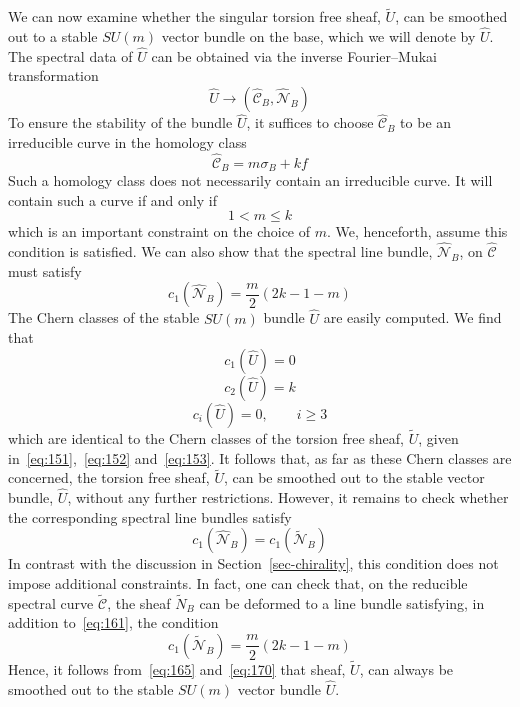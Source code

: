 \documentclass[a4paper,12pt]{article}
\numberwithin{equation}{section}
\def\cC{{\mathcal C}}
\def\cN{{\mathcal N}}
\theoremstyle{plain}
\begin{document}
We can now examine whether the singular torsion free sheaf,  
$\widetilde{U}$, can
be smoothed out to a stable $SU(m)$ vector bundle on the base, which we
will denote by $\widehat{U}$. The spectral data of $\widehat{U}$ 
can be obtained via
the inverse Fourier--Mukai transformation
\begin{equation}
\widehat{U} \longrightarrow (\widehat{\cC}_{B}, \widehat{\cN}_{B})
\label{eq:162}
\end{equation}
To ensure the stability of 
the bundle $\widehat{U}$, it suffices to choose $\widehat{\cC}_{B}$ 
to be an
irreducible curve in the homology class
\begin{equation}
\widehat{\cC}_{B}= m\sigma_{B}+ kf
\label{eq:163}
\end{equation}
Such a homology class does not necessarily contain an 
irreducible curve. It will contain such a curve if
and only if
\begin{equation}
1 < m \leq k
\label{eq:164}
\end{equation}
which is an important constraint on the choice of $m$. We, henceforth, assume
this condition is satisfied.
We can also show that the spectral line bundle, 
$\widehat{\cN}_{B}$, on $\widehat{\cC}$ must satisfy
\begin{equation}
c_{1}(\widehat{\cN}_{B})= \frac{m}{2}(2k -1 -m)
\label{eq:165}
\end{equation}
The Chern classes of the stable $SU(m)$ bundle $\widehat{U}$
are easily computed. We find that
\begin{equation}
c_{1}(\widehat{U})=0
\label{eq:166}
\end{equation}
\begin{equation}
c_{2}(\widehat{U})=k
\label{eq:167}
\end{equation}
\begin{equation}
c_{i}(\widehat{U})=0, \qquad i\geq3
\label{eq:168}
\end{equation}
which are identical to the Chern classes of the torsion free sheaf,
$\widetilde{U}$, given in~\eqref{eq:151},~\eqref{eq:152} and~\eqref{eq:153}. It
follows that, as far as these Chern classes are concerned, the torsion free
sheaf, $\widetilde{U}$, can be smoothed out to the stable vector bundle,
$\widehat{U}$, without any further restrictions. However, it
remains to check whether the corresponding spectral line bundles satisfy
\begin{equation}
c_{1}(\widehat{\cN}_{B})=c_{1}(\widetilde{\cN}_{B})
\label{eq:169}
\end{equation}
In contrast with the discussion in Section~\ref{sec-chirality}, this
condition does not impose additional constraints. In fact, one can check 
that, on the reducible spectral curve $\widetilde{\cC}$, the sheaf
$\widetilde{N}_{B}$ can be deformed to a line bundle satisfying, in addition
to~\eqref{eq:161}, the condition
\begin{equation}
c_{1}(\widetilde{\cN}_{B})= \frac{m}{2}(2k -1 -m)
\label{eq:170}
\end{equation}
Hence, it follows from~\eqref{eq:165} and~\eqref{eq:170} that
sheaf, $\widetilde{U}$, can always be smoothed out to the stable 
$SU(m)$ vector bundle $\widehat{U}$.
\end{document}
